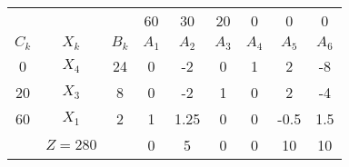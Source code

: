     \begin{tabular}{ccccccccc}
    \hline
    \hline
            &         &         & 60      & 30      & 20      & 0       & 0       & 0 \bigstrut[t]\\
    $C_k$   & $X_k$   & $B_k$   & $A_1$   & $A_2$   & $A_3$   & $A_4$   & $A_5$   & $A_6$ \bigstrut[b]\\
    \hline
    0       & $X_4$   & 24      & 0       & -2      & 0       & 1       & 2       & -8 \bigstrut[t]\\
    20      & $X_3$   & 8       & 0       & -2      & 1       & 0       & 2       & -4 \\
    60      & $X_1$   & 2       & 1       & 1.25    & 0       & 0       & -0.5    & 1.5 \bigstrut[b]\\
    \hline
            & $Z=280$ &         & 0       & 5       & 0       & 0       & 10      & 10 \bigstrut\\
    \hline
    \hline
    \end{tabular}%
